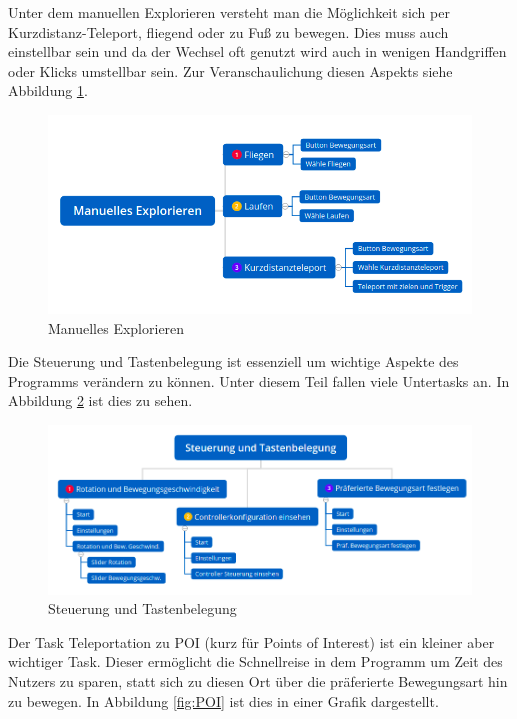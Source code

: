\documentclass{TUBAFarbeiten}
\begin{document}
Unter dem manuellen Explorieren versteht man die Möglichkeit sich per Kurzdistanz-Teleport, fliegend oder zu Fuß zu bewegen. Dies muss auch einstellbar sein und da der Wechsel oft genutzt wird auch in wenigen Handgriffen oder Klicks umstellbar sein. Zur Veranschaulichung diesen Aspekts siehe Abbildung \ref{fig:explo}.\\

\begin{figure}
	\centering
	\includegraphics[width=\linewidth]{explorer.png}
	\caption{Manuelles Explorieren}
	\label{fig:explo}
\end{figure}

Die Steuerung und Tastenbelegung ist essenziell um wichtige Aspekte des Programms verändern zu können. Unter diesem Teil fallen viele Untertasks an. In Abbildung \ref{fig:s&t} ist dies zu sehen.

\begin{figure}
	\centering
	\includegraphics[width=\linewidth]{einstellungen.png}
	\caption{Steuerung und Tastenbelegung}
	\label{fig:s&t}
\end{figure}

Der Task Teleportation zu POI (kurz für Points of Interest) ist ein kleiner aber wichtiger Task. Dieser ermöglicht die Schnellreise in dem Programm um Zeit des Nutzers zu sparen, statt sich zu diesen Ort über die präferierte Bewegungsart hin zu bewegen. In Abbildung \ref{fig:POI} ist dies in einer Grafik dargestellt.
\end{document}
